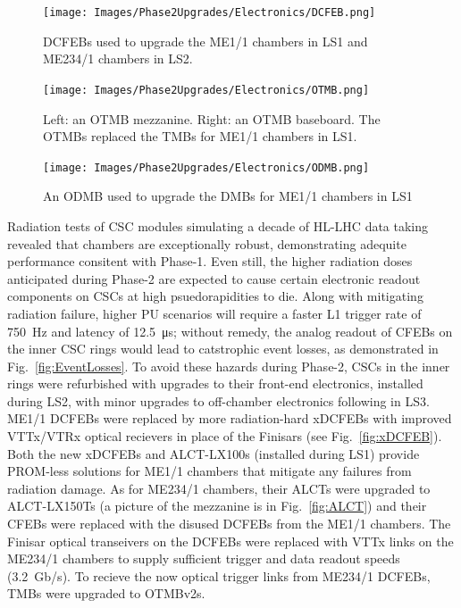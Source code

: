 \begin{figure}[H]
    \centering
    \texttt{[image: Images/Phase2Upgrades/Electronics/DCFEB.png]}
    \caption{DCFEBs used to upgrade the ME1/1 chambers in LS1 and ME234/1 chambers in LS2.}
    \label{fig:DCFEB}
\end{figure}

\begin{figure}[H]
    \centering
    \texttt{[image: Images/Phase2Upgrades/Electronics/OTMB.png]}
    \caption{Left: an OTMB mezzanine. Right: an OTMB baseboard. The OTMBs replaced the TMBs for ME1/1 chambers in LS1.}
    \label{fig:OTMB}
\end{figure}

\begin{figure}[H]
    \centering
    \texttt{[image: Images/Phase2Upgrades/Electronics/ODMB.png]}
    \caption{An ODMB used to upgrade the DMBs for ME1/1 chambers in LS1}
    \label{fig:ODMB}
\end{figure}

Radiation tests of CSC modules simulating a decade of HL-LHC data taking revealed that chambers are exceptionally robust, demonstrating adequite performance consitent with Phase-1. Even still, the higher radiation doses anticipated during Phase-2 are expected to cause certain electronic readout components on CSCs at high psuedorapidities to die. Along with mitigating radiation failure, higher PU scenarios will require a faster L1 trigger rate of \SI{750}{Hz} and latency of \SI{12.5}{\micro s}; without remedy, the analog readout of CFEBs on the inner CSC rings would lead to catstrophic event losses, as demonstrated in Fig.~\ref{fig:EventLosses}. To avoid these hazards during Phase-2, CSCs in the inner rings were refurbished with upgrades to their front-end electronics, installed during LS2, with minor upgrades to off-chamber electronics following in LS3. ME1/1 DCFEBs were replaced by more radiation-hard xDCFEBs with improved VTTx/VTRx optical recievers in place of the Finisars (see Fig.~\ref{fig:xDCFEB}). Both the new xDCFEBs and ALCT-LX100s (installed during LS1) provide PROM-less solutions for ME1/1 chambers that mitigate any failures from radiation damage. As for ME234/1 chambers, their ALCTs were upgraded to ALCT-LX150Ts (a picture of the mezzanine is in Fig.~\ref{fig:ALCT}) and their CFEBs were replaced with the disused DCFEBs from the ME1/1 chambers. The Finisar optical transeivers on the DCFEBs were replaced with VTTx links on the ME234/1 chambers to supply sufficient trigger and data readout speeds (\SI{3.2}{Gb/s}). To recieve the now optical trigger links from ME234/1 DCFEBs, TMBs were upgraded to OTMBv2s. 

